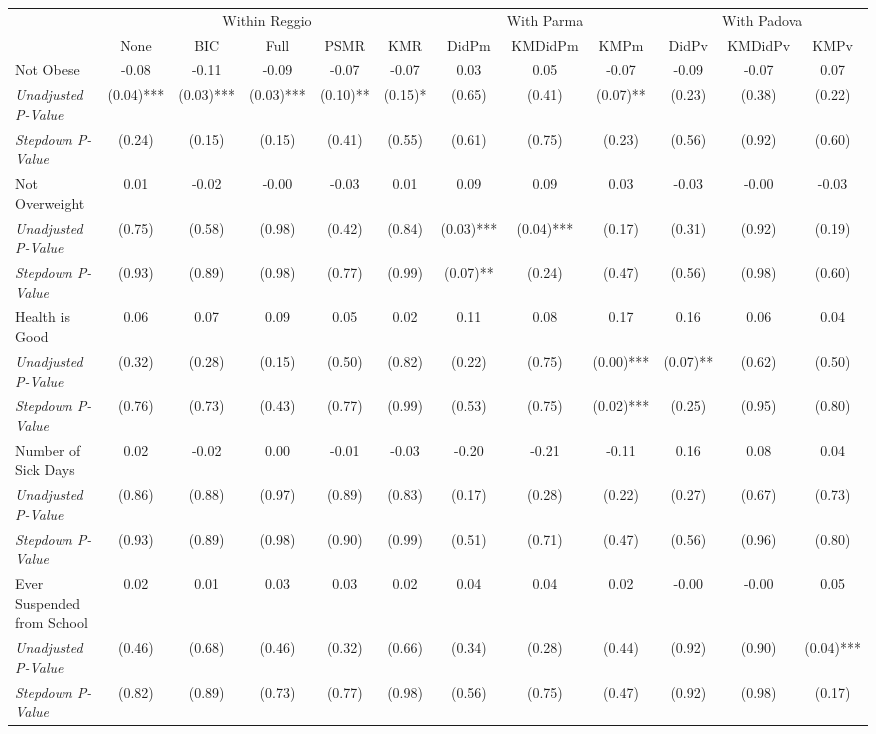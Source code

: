 \begin{tabular}{l c c c c c c c c c c c}
\toprule
& \multicolumn{5}{c}{Within Reggio} & \multicolumn{3}{c}{With Parma} & \multicolumn{3}{c}{With Padova} \\\cmidrule(lr){2-6} \cmidrule(lr){7-9} \cmidrule(lr){10-12}
 & None & BIC & Full & PSMR & KMR & DidPm & KMDidPm & KMPm & DidPv & KMDidPv & KMPv \\
\midrule
Not Obese & -0.08 & -0.11 & -0.09 & -0.07 & -0.07 & 0.03 & 0.05 & -0.07 & -0.09 & -0.07 & 0.07 \\
\quad \textit{Unadjusted P-Value} & (0.04)*** & (0.03)*** & (0.03)*** & (0.10)** & (0.15)* & (0.65) & (0.41) & (0.07)** & (0.23) & (0.38) & (0.22) \\
\quad \textit{Stepdown P-Value} & (0.24) & (0.15) & (0.15) & (0.41) & (0.55) & (0.61) & (0.75) & (0.23) & (0.56) & (0.92) & (0.60) \\
Not Overweight & 0.01 & -0.02 & -0.00 & -0.03 & 0.01 & 0.09 & 0.09 & 0.03 & -0.03 & -0.00 & -0.03 \\
\quad \textit{Unadjusted P-Value} & (0.75) & (0.58) & (0.98) & (0.42) & (0.84) & (0.03)*** & (0.04)*** & (0.17) & (0.31) & (0.92) & (0.19) \\
\quad \textit{Stepdown P-Value} & (0.93) & (0.89) & (0.98) & (0.77) & (0.99) & (0.07)** & (0.24) & (0.47) & (0.56) & (0.98) & (0.60) \\
Health is Good & 0.06 & 0.07 & 0.09 & 0.05 & 0.02 & 0.11 & 0.08 & 0.17 & 0.16 & 0.06 & 0.04 \\
\quad \textit{Unadjusted P-Value} & (0.32) & (0.28) & (0.15) & (0.50) & (0.82) & (0.22) & (0.75) & (0.00)*** & (0.07)** & (0.62) & (0.50) \\
\quad \textit{Stepdown P-Value} & (0.76) & (0.73) & (0.43) & (0.77) & (0.99) & (0.53) & (0.75) & (0.02)*** & (0.25) & (0.95) & (0.80) \\
Number of Sick Days & 0.02 & -0.02 & 0.00 & -0.01 & -0.03 & -0.20 & -0.21 & -0.11 & 0.16 & 0.08 & 0.04 \\
\quad \textit{Unadjusted P-Value} & (0.86) & (0.88) & (0.97) & (0.89) & (0.83) & (0.17) & (0.28) & (0.22) & (0.27) & (0.67) & (0.73) \\
\quad \textit{Stepdown P-Value} & (0.93) & (0.89) & (0.98) & (0.90) & (0.99) & (0.51) & (0.71) & (0.47) & (0.56) & (0.96) & (0.80) \\
Ever Suspended from School & 0.02 & 0.01 & 0.03 & 0.03 & 0.02 & 0.04 & 0.04 & 0.02 & -0.00 & -0.00 & 0.05 \\
\quad \textit{Unadjusted P-Value} & (0.46) & (0.68) & (0.46) & (0.32) & (0.66) & (0.34) & (0.28) & (0.44) & (0.92) & (0.90) & (0.04)*** \\
\quad \textit{Stepdown P-Value} & (0.82) & (0.89) & (0.73) & (0.77) & (0.98) & (0.56) & (0.75) & (0.47) & (0.92) & (0.98) & (0.17) \\
\bottomrule
\end{tabular}
